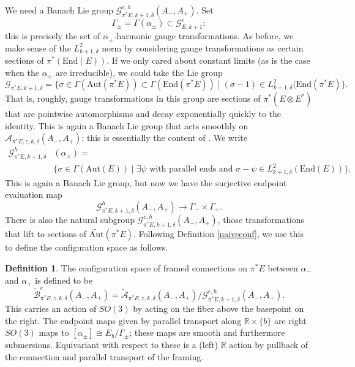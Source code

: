 \documentclass{memo-l}
\newcommand{\pE}{\pi^* \! E}
\theoremstyle{definition}
\newtheorem{definition}[theorem]{Definition}
\theoremstyle{remark}
\numberwithin{section}{chapter}
\numberwithin{equation}{chapter}
\begin{document}
We need a Banach Lie group $\mathcal G^{e,h}_{\pE,k+1,\delta}(A_-, A_+)$. Set 
$$\Gamma_\pm = \Gamma(\alpha_\pm) \subset \mathcal G^e_{E,k+1};$$ 
this is precisely the set of $\alpha_\pm$-harmonic gauge transformations. As before, we make sense of the $L^2_{k+1,\delta}$ norm by considering gauge transformations as certain sections of $\pi^*(\text{End}(E))$. If we only cared about constant limits (as is the case when the $\alpha_\pm$ are irreducible), we could take the Lie group 
$$\mathcal G_{\pE, k+1, \delta} = \{\sigma \in \Gamma(\text{Aut}(\pE)) \subset \Gamma(\text{End}(\pE)) \mid (\sigma - 1) \in L^2_{k+1,\delta}(\text{End}(\pE)\}.$$ 
That is, roughly, gauge transformations in this group are sections of $\pi^*(E \otimes E^*)$ that are pointwise automorphisms and decay exponentially quickly to the identity. This is again a Banach Lie group that acts smoothly on $\mathcal A_{\pE,z,k,\delta}(A_-, A_+)$; this is essentially the content of \cite[Section~4.3]{Don}. We write 
\begin{align*}
\mathcal G^{h}_{\pE, k+1, \delta}&(\alpha_\pm) = \\
&\{\sigma \in \Gamma(\text{Aut}(E)) \mid \exists \psi \text{ with parallel ends and } \sigma - \psi \in L^2_{k+1,\delta}(\text{End}(E))\}.
\end{align*}
This is again a Banach Lie group, but now we have the surjective endpoint evaluation map 
$$\mathcal G^{h}_{\pE, k+1, \delta}(A_-, A_+) \to \Gamma_- \times \Gamma_+.$$ 
There is also the natural subgroup $\mathcal G^{e,h}_{\pE, k+1, \delta}(A_-, A_+)$, those transformations that lift to sections of $\widetilde{\text{Aut}}(\pE)$. Following Definition \ref{naiveconf}, we use this to define the configuration space as follows. 

\begin{definition}\label{conf}The configuration space of framed connections on $\pE$ between $\alpha_-$ and $\alpha_+$ is defined to be $$\widetilde{\mathcal B}^{e}_{\pE, z, k, \delta}(A_-, A_+) = \widetilde{\mathcal A}_{\pE, z, k, \delta}(A_-, A_+)/\mathcal G^{e,h}_{\pE, k+1, \delta}(A_-, A_+).$$ This carries an action of $SO(3)$ by acting on the fiber above the basepoint on the right. The endpoint maps given by parallel transport along $\mathbb R \times \{b\}$ are right $SO(3)$ maps to $[\alpha_\pm] \cong E_b/\Gamma_\pm$; these maps are smooth and furthermore submersions. Equivariant with respect to these is a (left) $\mathbb R$ action by pullback of the connection and parallel transport of the framing.
\end{definition}
\end{document}
